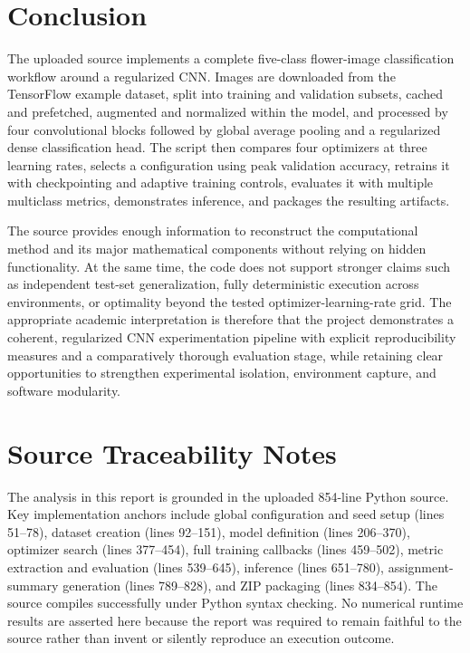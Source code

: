 \documentclass[11pt,a4paper]{article}
\begin{document}
\section{Conclusion}
The uploaded source implements a complete five-class flower-image classification workflow around a regularized CNN. Images are downloaded from the TensorFlow example dataset, split into training and validation subsets, cached and prefetched, augmented and normalized within the model, and processed by four convolutional blocks followed by global average pooling and a regularized dense classification head. The script then compares four optimizers at three learning rates, selects a configuration using peak validation accuracy, retrains it with checkpointing and adaptive training controls, evaluates it with multiple multiclass metrics, demonstrates inference, and packages the resulting artifacts.

The source provides enough information to reconstruct the computational method and its major mathematical components without relying on hidden functionality. At the same time, the code does not support stronger claims such as independent test-set generalization, fully deterministic execution across environments, or optimality beyond the tested optimizer-learning-rate grid. The appropriate academic interpretation is therefore that the project demonstrates a coherent, regularized CNN experimentation pipeline with explicit reproducibility measures and a comparatively thorough evaluation stage, while retaining clear opportunities to strengthen experimental isolation, environment capture, and software modularity.

\section*{Source Traceability Notes}
The analysis in this report is grounded in the uploaded 854-line Python source. Key implementation anchors include global configuration and seed setup (lines 51--78), dataset creation (lines 92--151), model definition (lines 206--370), optimizer search (lines 377--454), full training callbacks (lines 459--502), metric extraction and evaluation (lines 539--645), inference (lines 651--780), assignment-summary generation (lines 789--828), and ZIP packaging (lines 834--854). The source compiles successfully under Python syntax checking. No numerical runtime results are asserted here because the report was required to remain faithful to the source rather than invent or silently reproduce an execution outcome.
\end{document}
